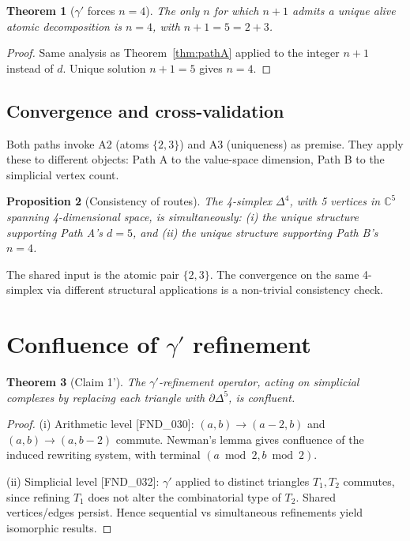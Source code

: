 \documentclass[11pt]{article}
\newtheorem{theorem}{Theorem}
\newtheorem{proposition}[theorem]{Proposition}
\begin{document}
\begin{theorem}[$\gamma'$ forces $n = 4$]
\label{thm:pathB}
The only $n$ for which $n + 1$ admits a unique alive atomic
decomposition is $n = 4$, with $n + 1 = 5 = 2 + 3$.
\end{theorem}

\begin{proof}
Same analysis as Theorem~\ref{thm:pathA} applied to the integer
$n + 1$ instead of $d$. Unique solution $n + 1 = 5$ gives $n = 4$.
\end{proof}

\subsection{Convergence and cross-validation}

Both paths invoke A2 (atoms $\{2, 3\}$) and A3 (uniqueness) as
premise. They apply these to different objects: Path A to the
value-space dimension, Path B to the simplicial vertex count.

\begin{proposition}[Consistency of routes]
The 4-simplex $\Delta^4$, with 5 vertices in $\mathbb{C}^5$ spanning
4-dimensional space, is simultaneously:
(i) the unique structure supporting Path A's $d = 5$, and
(ii) the unique structure supporting Path B's $n = 4$.
\end{proposition}

The shared input is the atomic pair $\{2, 3\}$. The convergence
on the same 4-simplex via different structural applications is a
non-trivial consistency check.

\section{Confluence of $\gamma'$ refinement}

\begin{theorem}[Claim 1']
\label{thm:confluence}
The $\gamma'$-refinement operator, acting on simplicial complexes
by replacing each triangle with $\partial \Delta^5$, is confluent.
\end{theorem}

\begin{proof}
(i) Arithmetic level [FND\_030]: $(a, b) \to (a - 2, b)$ and
$(a, b) \to (a, b - 2)$ commute. Newman's lemma gives confluence
of the induced rewriting system, with terminal $(a \bmod 2, b \bmod 2)$.

(ii) Simplicial level [FND\_032]: $\gamma'$ applied to distinct
triangles $T_1, T_2$ commutes, since refining $T_1$ does not alter
the combinatorial type of $T_2$. Shared vertices/edges persist.
Hence sequential vs simultaneous refinements yield isomorphic
results.
\end{proof}
\end{document}
